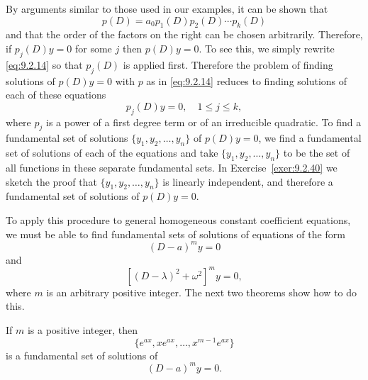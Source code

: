 By arguments similar to those used in our examples, it can be shown that
\begin{equation}
  \label{eq:9.2.14}p(D)=a_{0}p_{1}(D)p_{2}(D)\cdots p_{k}(D)
\end{equation}
and that the order of the factors on the right can be chosen arbitrarily. Therefore, if
$p_{j}(D)y=0$ for some $j$ then $p(D)y=0$. To see this, we simply rewrite \eqref{eq:9.2.14} so that
$p_{j}(D)$ is applied first. Therefore the problem of finding solutions of $p(D)y=0$ with $p$ as in
\eqref{eq:9.2.14} reduces to finding solutions of each of these equations
\[
  p_{j}(D)y=0,\quad1\le j\le k,
\]
where $p_{j}$ is a power of a first degree term or of an irreducible quadratic. To find a
fundamental set of solutions $\{y_{1},y_{2},\dots,y_{n}\}$ of $p(D)y=0$, we find a fundamental set of
solutions of each of the equations and take $\{y_{1},y_{2},\dots,y_{n}\}$ to be the set of all
functions in these separate fundamental sets. In Exercise~\ref{exer:9.2.40} we sketch the proof that
$\{y_{1},y_{2},\dots,y_{n}\}$ is linearly independent, and therefore a fundamental set of solutions
of $p(D)y=0$.

To apply this procedure to general homogeneous constant coefficient equations, we must be able to
find fundamental sets of solutions of equations of the form
\[
  (D-a)^{m}y=0
\]
and
\[
  \left[(D-\lambda)^{2}+\omega^{2}\right]^{m}y=0,
\]
where $m$ is an arbitrary positive integer. The next two theorems show how to do this.

\begin{theorem}
  \color{blue}
  \label{thmtype:9.2.1} If $m$ is a positive integer, then
  \begin{equation}
    \label{eq:9.2.15}\{e^{ax},xe^{ax},\dots,x^{m-1}e^{ax}\}
  \end{equation}
  is a fundamental set of solutions of
  \begin{equation}
    \label{eq:9.2.16}(D-a)^{m}y=0.
  \end{equation}
\end{theorem}

